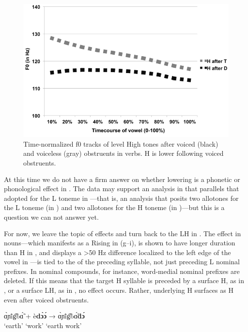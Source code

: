 \documentclass[output=paper,newtxmath,modfonts,nonflat,hidelinks]{langsci/langscibook}
\begin{document}
  
\begin{figure} 
\includegraphics[height=.4\textheight]{figures/Lotven-img6.png}
\caption{\label{fig:lotven:5} Time-normalized f0 tracks of level High tones after voiced (black) and voiceless (gray) obstruents in verbs. H is lower following voiced obstruents.}
\end{figure}


At this time we do not have a firm answer on whether   lowering is a phonetic or phonological effect in . The data may support an analysis in  that parallels that adopted for the L toneme in —that is, an analysis that posits two allotones for the L toneme (in ) and two allotones for the H toneme (in )—but this is a question we can not answer yet. 

For now, we leave the topic of   effects and turn back to the LH  in . The  effect in nouns—which manifests as a Rising  in  (g–i), is shown to have longer duration than H in , and displays a >50 Hz  difference localized to the left edge of the vowel in —is tied to the  of the preceding syllable, not just preceding L  nominal prefixes. In nominal compounds, for instance, word-medial nominal prefixes are deleted. If this means that the target H  syllable is preceded by a surface H, as in , or a surface LH, as in , no  effect occurs. Rather, underlying H surfaces as H even after voiced obstruents. 

\ea\label{ex:lotven:1}
    \gll ɑ̀ɲĩ́g͡bɑ̃́ + è\textbf{dɔ̀ɔ́} → ɑ̀ɲĩ́g͡bɑ̃́\textbf{dɔ́}\\
    ‘earth’ {} ‘work’ {} {‘earth work’}     \\
    \glt 
    \z
\end{document}
